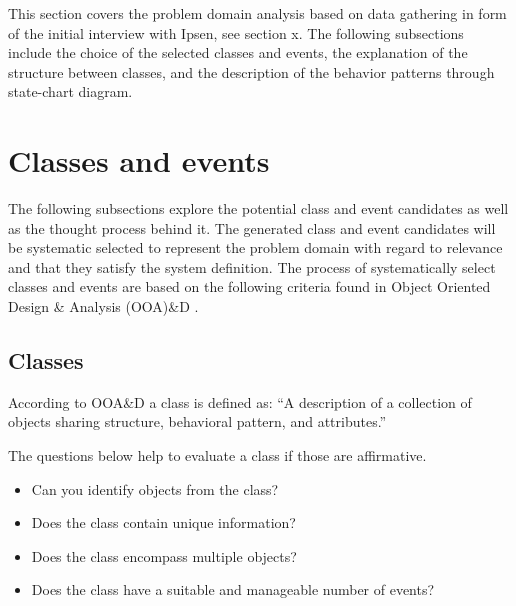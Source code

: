 This section covers the problem domain analysis based on data gathering in form of the initial interview with Ipsen, see section x.
The following subsections include the choice of the selected classes and events, the explanation of the structure between classes, and the description of the behavior patterns through state-chart diagram.

\section{Classes and events}
The following subsections explore the potential class and event candidates as well as the thought process behind it.
The generated class and event candidates will be systematic selected to represent the problem domain with regard to relevance and that they satisfy the system definition.
The process of systematically select classes and events are based on the following criteria found in Object Oriented Design \& Analysis (OOA)\&D \citep[p.~63-67]{Rod-Aalborg} .

\subsection{Classes}
According to OOA\&D a class is defined as:
“A description of a collection of objects sharing structure, behavioral pattern, and attributes.”

The questions below help to evaluate a class if those are affirmative. \citep[p.~62]{Rod-Aalborg}
\begin{itemize}
	\item Can you identify objects from the class?
	\item Does the class contain unique information?
	\item Does the class encompass multiple objects?
	\item Does the class have a suitable and manageable number of events?
\end{itemize}

